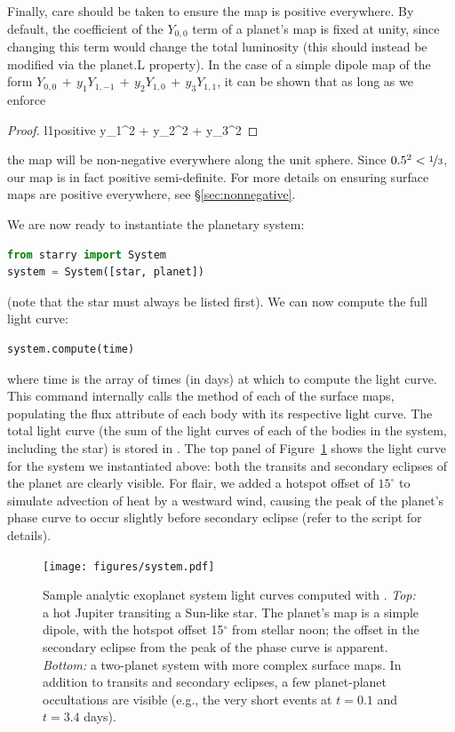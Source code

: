 \documentclass[modern]{aastex61}
\begin{document}
%
Finally, care should be taken to ensure the map is positive everywhere. By default,
the coefficient of the $Y_{0,0}$ term of a planet's map is fixed at unity, since
changing this term would change the total luminosity (this should instead be
modified via the \textsf{planet.L} property). In the case of a simple dipole map of
the form $Y_{0,0} \, + \, y_1 Y_{1, -1} \, + \, y_2 Y_{1, 0} \, + \, y_3 Y_{1, 1}$,
it can be shown that as long as we enforce
%
\begin{proof}{l1positive}
    \label{l1positive}
    y_1^2 + y_2^2 + y_3^2 \le {}
\end{proof}
%
the map will be non-negative everywhere along the unit sphere. Since $0.5^2 < \nicefrac{1}{3}$,
our map is in fact positive semi-definite.
%
For more details on ensuring surface maps are positive everywhere, see
\S\ref{sec:nonnegative}.

We are now ready to instantiate the planetary system:
%
\begin{lstlisting}[language=Python,firstnumber=last]
from starry import System
system = System([star, planet])
\end{lstlisting}
%
(note that the star must always be listed first).
We can now compute the full light curve:
%
\begin{lstlisting}[language=Python,firstnumber=last]
system.compute(time)
\end{lstlisting}
%
where \textsf{time} is the array of times (in days) at which to compute the
light curve. This command internally calls the \flux method of each
of the surface maps, populating the \textsf{flux} attribute of each body
with its respective light curve. The total light curve (the sum of the
light curves of each of the bodies in the system, including the star) is
stored in \starrySystemflux. The top panel of Figure~\ref{fig:system} shows
the light curve for the system we instantiated above: both the transits
and secondary eclipses of the planet are clearly visible. For flair, we added
a hotspot offset of $15^\circ$ to simulate advection of heat by a
westward wind, causing the peak of the planet's phase curve to occur slightly
before secondary eclipse (refer to the \Python script for details).

%
\begin{figure}[ht]
    \begin{centering}
    \texttt{[image: figures/system.pdf]}
    \caption{\label{fig:system}
             Sample analytic exoplanet system light curves computed with \starry.
             \emph{Top:} a hot Jupiter
             transiting a Sun-like star. The planet's map is a simple dipole,
             with the hotspot offset 15$^\circ$ from stellar noon; the offset
             in the secondary eclipse from the peak of the phase curve is
             apparent. \emph{Bottom:} a two-planet system with more complex
             surface maps. In addition to transits and secondary eclipses,
             a few planet-planet occultations are visible (e.g., the very short
             events at $t=0.1$ and $t=3.4$ days).
             }
    \end{centering}
\end{figure}
%
\end{document}
